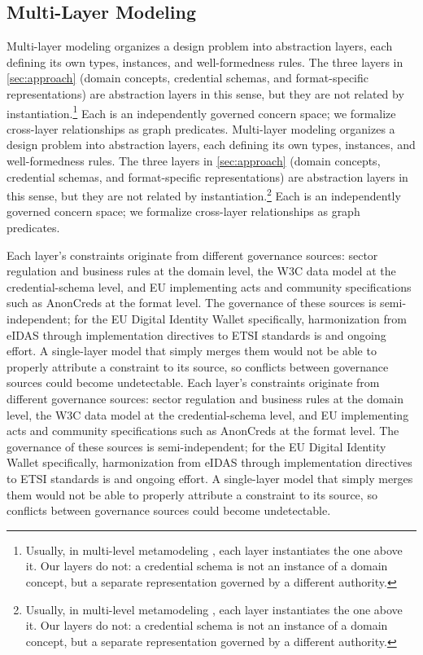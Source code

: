 \subsection{Multi-Layer Modeling}\label{sec:multi-layer}

Multi-layer modeling organizes a design problem into abstraction layers, each defining its own types, instances, and well-formedness rules. The three layers in \autoref{sec:approach} (domain concepts, credential schemas, and format-specific representations) are abstraction layers in this sense, but they are not related by instantiation.\footnote{Usually, in multi-level metamodeling \citep{goos_essence_2001}, each layer instantiates the one above it. Our layers do not: a credential schema is not an instance of a domain concept, but a separate representation governed by a different authority.} Each is an independently governed concern space; we formalize cross-layer relationships as graph predicates.
Multi-layer modeling organizes a design problem into abstraction layers, each defining its own types, instances, and well-formedness rules. The three layers in \autoref{sec:approach} (domain concepts, credential schemas, and format-specific representations) are abstraction layers in this sense, but they are not related by instantiation.\footnote{Usually, in multi-level metamodeling \citep{goos_essence_2001}, each layer instantiates the one above it. Our layers do not: a credential schema is not an instance of a domain concept, but a separate representation governed by a different authority.} Each is an independently governed concern space; we formalize cross-layer relationships as graph predicates.

Each layer's constraints originate from different governance sources: sector regulation and business rules at the domain level, the W3C data model at the credential-schema level, and EU implementing acts and community specifications such as AnonCreds \citep{curran2022anoncreds} at the format level. The governance of these sources is semi-independent; for the EU Digital Identity Wallet specifically, harmonization from eIDAS through implementation directives to ETSI standards is and ongoing effort. A single-layer model that simply merges them would not be able to properly attribute a constraint to its source, so conflicts between governance sources could become undetectable.
Each layer's constraints originate from different governance sources: sector regulation and business rules at the domain level, the W3C data model at the credential-schema level, and EU implementing acts and community specifications such as AnonCreds \citep{curran2022anoncreds} at the format level. The governance of these sources is semi-independent; for the EU Digital Identity Wallet specifically, harmonization from eIDAS through implementation directives to ETSI standards is and ongoing effort. A single-layer model that simply merges them would not be able to properly attribute a constraint to its source, so conflicts between governance sources could become undetectable.

